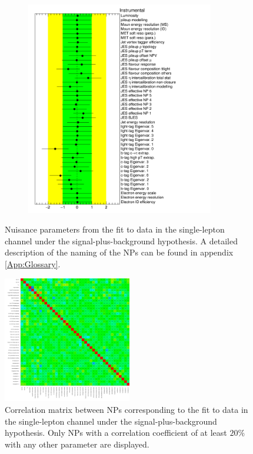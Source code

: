 \begin{figure}[htbp!]
\begin{subfigure}{0.5\textwidth}
  \includegraphics[width=0.9\textwidth]{figures/ttH/NuisPar_Instrumental.png}
\end{subfigure}
\captionsetup{width=0.85\textwidth}  \caption{\small Nuisance parameters from the fit to data in the single-lepton channel under the signal-plus-background hypothesis. A detailed description of the naming of the NPs can be found in appendix \ref{App:Glossary}.}
\label{sec:ttH:fig:Fit}
\end{figure}

\begin{figure}[h!]
 \centering
 \includegraphics[width=0.5\textwidth]{figures/ttH/CorrMatrix.png}
\captionsetup{width=0.85\textwidth}  \caption{\small Correlation matrix between NPs corresponding to the fit to data in the single-lepton channel under the signal-plus-background hypothesis. Only NPs with a correlation coefficient of at least $20\%$ with any other parameter are displayed.}
\label{sec:ttH:fig:matr}
\end{figure}


